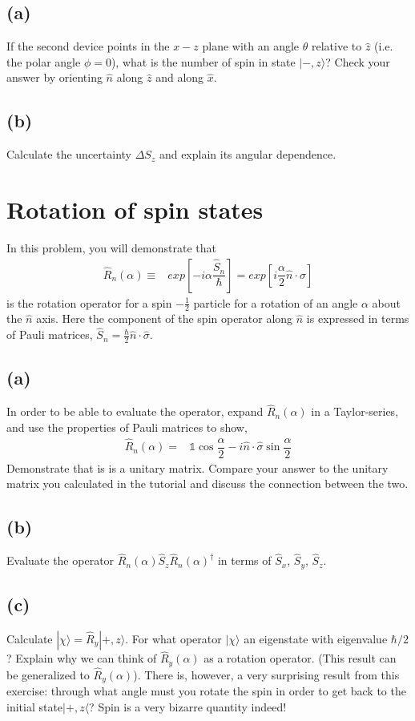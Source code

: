 \documentclass[12pt, a4paper]{article}
\begin{document}
\subsection*{(a)}
If the second device points in the $x - z$ plane with an angle $\theta$ relative to $\hat{z}$ (i.e. the polar angle $\phi =0$), what is the number of spin in state $|-,z\rangle$? Check your answer by orienting $\hat{n}$ along $\hat{z}$ and along $\hat{x}$.

\subsection*{(b)}
Calculate the uncertainty $\Delta S_z$ and explain its angular dependence.



\section{Rotation of spin states}
In this problem, you will demonstrate that
\begin{align*}
\hat{R}_n (\alpha) \equiv& exp\left[-i\alpha\dfrac{\hat{S}_n}{\hbar}\right] = exp\left[i\dfrac{\alpha}{2}\hat{n}\cdot{\sigma}\right]
\end{align*}
is the rotation operator for a spin $-\frac{1}{2}$ particle for a rotation of an angle $\alpha$ about the $\hat{n}$ axis. Here the component of the spin operator along $\hat{n}$ is expressed in terms of Pauli matrices, $ \hat{S}_n = \frac{\hbar}{2}\hat{n}\cdot\hat{\sigma}$.

\subsection*{(a)}
In order to be able to evaluate the operator, expand $\hat{R}_n(\alpha)$ in a Taylor-series, and use the properties of Pauli matrices to show,
\begin{align*}
\hat{R}_n (\alpha) =& \mathds{1} \cos\dfrac{\alpha}{2}-i\hat{n}\cdot\hat{\sigma}\sin\dfrac{\alpha}{2}
\end{align*}
Demonstrate that is is a unitary matrix. Compare your answer to the unitary matrix you calculated in the tutorial and discuss the connection between the two. 

\subsection*{(b)}
Evaluate the operator $\hat{R}_n(\alpha)\hat{S}_z\hat{R}_n(\alpha)^\dagger$ in terms of $\hat{S}_x$, $\hat{S}_y$, $\hat{S}_z$.

\subsection*{(c)}
Calculate $|\chi\rangle = \hat{R}_y |+,z\rangle$. For what operator $|\chi\rangle$ an eigenstate with eigenvalue $\hbar/2$? Explain why we can think of $\hat{R}_y(\alpha)$ as a rotation operator. (This result can be generalized to $\hat{R}_y(\alpha)$). There is, however, a very surprising result from this exercise: through what angle must you rotate the spin in order to get back to the initial state$|+,z\langle$? Spin is a very bizarre quantity indeed!
\end{document}
